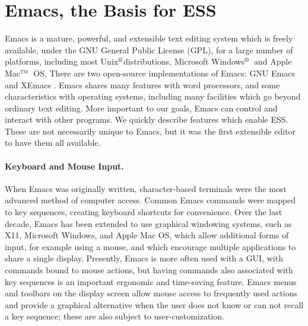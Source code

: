 \documentclass{article}
\newcommand*{\regstrd}{$^{\mbox{\scriptsize{\textregistered}}}$}
\newcommand*{\tm}{$^{\mbox{\scriptsize\sc tm}}$}
\begin{document}
\section{Emacs, the Basis for ESS}
\label{sec:emacs}

Emacs is a mature, powerful, and extensible text editing system which
is freely available, under the GNU General Public License (GPL), for a
large number of platforms, including most Unix\regstrd distributions,
Microsoft Windows\regstrd\ and Apple Mac\tm\ OS.  There are two
open-source implementations of Emacs: GNU Emacs \citep{GNU-Emacs} and
XEmacs \citep{XEmacs}.  Emacs shares many features with word
processors, and some characteristics with operating systems, including
many facilities which go beyond ordinary text editing.  More important
to our goals, Emacs can control and interact with other programs.  We
quickly describe features which enable ESS.  These are not necessarily
unique to Emacs, but it was the first extensible editor to have them
all available.

\paragraph{Keyboard and Mouse Input.}
When Emacs was originally written, character-based terminals were the
most advanced method of computer access.  Common Emacs commands were
mapped to key sequences, creating keyboard shortcuts for convenience.
Over the last decade, Emacs has been extended to use graphical
windowing systems, such as X11, Microsoft Windows, and Apple Mac
OS, which allow additional forms of input, for example using a mouse,
and which encourage multiple applications to share a single display.
Presently, Emacs is more often used with a GUI, with commands bound to
mouse actions, but having commands also associated with key sequences
is an important ergonomic and time-saving feature.  Emacs menus and
toolbars on the display screen allow mouse access to frequently used
actions and provide a graphical alternative when the user does not
know or can not recall a key sequence; these are also subject to
user-customization.
\end{document}
